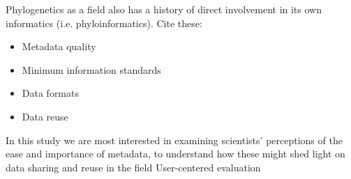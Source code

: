 \documentclass[12pt]{scrartcl}
\begin{document}
Phylogenetics as a field also has a history of direct involvement in its own informatics (i.e. phyloinformatics). %
Cite these:
\begin{itemize}
	\item Metadata quality
	\item Minimum information standards \citep{Leebens-Mack2006}
	\item Data formats \citep{Vos2012}
	\item Data reuse
\end{itemize}

In this study we are most interested in examining scientists' perceptions of the ease and importance of metadata, to understand how these might shed light on data sharing and reuse in the field
User-centered evaluation
\end{document}
